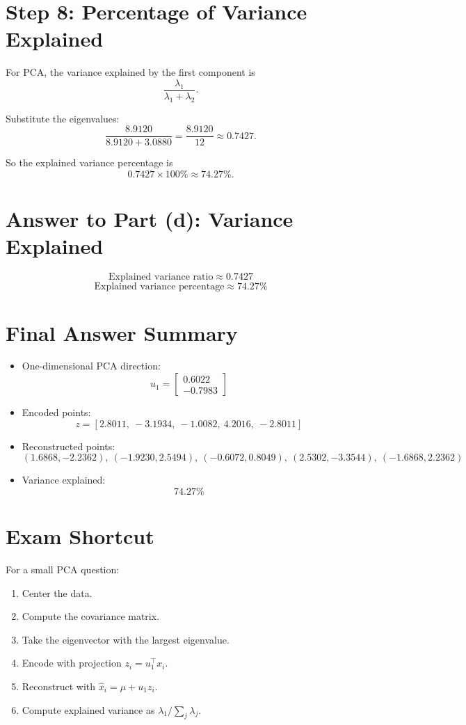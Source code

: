 \documentclass[11pt]{article}
\begin{document}
\section*{Step 8: Percentage of Variance Explained}

For PCA, the variance explained by the first component is
\[
    \frac{\lambda_1}{\lambda_1+\lambda_2}.
\]

Substitute the eigenvalues:
\[
    \frac{8.9120}{8.9120+3.0880}
    =
    \frac{8.9120}{12}
    \approx 0.7427.
\]

So the explained variance percentage is
\[
    0.7427 \times 100\% \approx 74.27\%.
\]

\section*{Answer to Part (d): Variance Explained}

\[
    \boxed{\text{Explained variance ratio} \approx 0.7427}
\]
\[
    \boxed{\text{Explained variance percentage} \approx 74.27\%}
\]

\section*{Final Answer Summary}

\begin{itemize}
    \item One-dimensional PCA direction:
    \[
        u_1=
        \begin{bmatrix}
            0.6022\\
            -0.7983
        \end{bmatrix}
    \]
    \item Encoded points:
    \[
        z=[2.8011,\ -3.1934,\ -1.0082,\ 4.2016,\ -2.8011]
    \]
    \item Reconstructed points:
    \[
        (1.6868,-2.2362),\ (-1.9230,2.5494),\ (-0.6072,0.8049),\ (2.5302,-3.3544),\ (-1.6868,2.2362)
    \]
    \item Variance explained:
    \[
        74.27\%
    \]
\end{itemize}

\section*{Exam Shortcut}

For a small PCA question:
\begin{enumerate}[label=\arabic*.]
    \item Center the data.
    \item Compute the covariance matrix.
    \item Take the eigenvector with the largest eigenvalue.
    \item Encode with projection \(z_i=u_1^\top x_i\).
    \item Reconstruct with \(\hat{x}_i=\mu+u_1 z_i\).
    \item Compute explained variance as \(\lambda_1/\sum_j \lambda_j\).
\end{enumerate}
\end{document}

